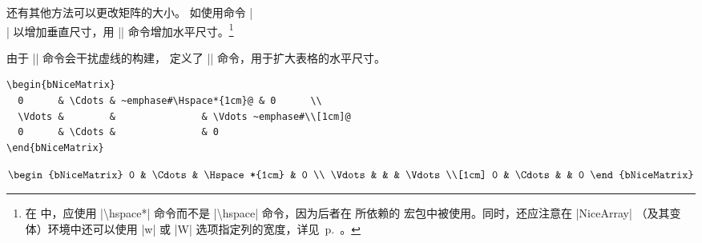\documentclass[dvipsnames]{article}%
\begin{document}
\bigskip 
还有其他方法可以更改矩阵的大小。 如使用命令 |\\[<高度>]| 以增加垂直尺寸，用 |\hspace*| 命令增加水平尺寸。\footnote{在  中，应使用 |\textbackslash hspace*| 命令而不是 |\textbackslash hspace| 命令，因为后者在  所依赖的  宏包中被使用。同时，还应注意在 |{NiceArray}| （及其变体）环境中还可以使用 |w| 或 |W| 选项指定列的宽度，详见~p.~\pageref{width}。}

由于 |\hspace*| 命令会干扰虚线的构建，  定义了 |\Hspace| 命令，用于扩大表格的水平尺寸。\par\nobreak

\bigskip
\begin{BVerbatim}[baseline=c,boxwidth=10cm]
\begin{bNiceMatrix}
  0      & \Cdots & ~emphase#\Hspace*{1cm}@ & 0      \\
  \Vdots &        &               & \Vdots ~emphase#\\[1cm]@
  0      & \Cdots &               & 0    
\end{bNiceMatrix}
\end{BVerbatim}
$\begin{bNiceMatrix}
0      & \Cdots & \Hspace*{1cm} & 0      \\
\Vdots &        &               & \Vdots \\[1cm]
0      & \Cdots &               & 0    
\end{bNiceMatrix}$

\end{document}
